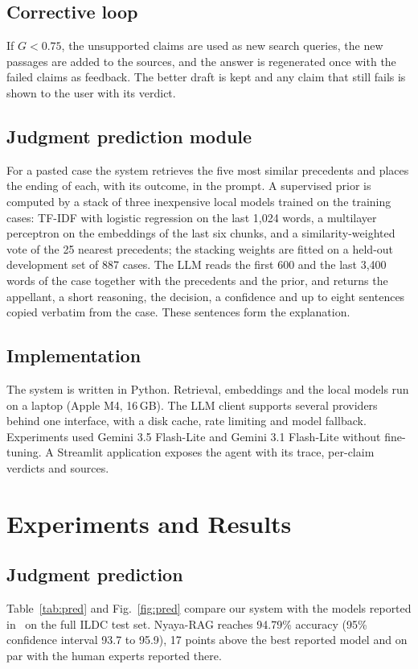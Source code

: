 \documentclass[conference]{IEEEtran}
\begin{document}
\subsection{Corrective loop}
If $G<0.75$, the unsupported claims are used as new search queries, the new passages are added to the sources, and the answer is regenerated once with the failed claims as feedback. The better draft is kept and any claim that still fails is shown to the user with its verdict.

\subsection{Judgment prediction module}
For a pasted case the system retrieves the five most similar precedents and places the ending of each, with its outcome, in the prompt. A supervised prior is computed by a stack of three inexpensive local models trained on the training cases: TF-IDF with logistic regression on the last 1,024 words, a multilayer perceptron on the embeddings of the last six chunks, and a similarity-weighted vote of the 25 nearest precedents; the stacking weights are fitted on a held-out development set of 887 cases. The LLM reads the first 600 and the last 3,400 words of the case together with the precedents and the prior, and returns the appellant, a short reasoning, the decision, a confidence and up to eight sentences copied verbatim from the case. These sentences form the explanation.

\subsection{Implementation}
The system is written in Python. Retrieval, embeddings and the local models run on a laptop (Apple M4, 16\,GB). The LLM client supports several providers behind one interface, with a disk cache, rate limiting and model fallback. Experiments used Gemini 3.5 Flash-Lite and Gemini 3.1 Flash-Lite without fine-tuning. A Streamlit application exposes the agent with its trace, per-claim verdicts and sources.

\section{Experiments and Results}
\subsection{Judgment prediction}
Table~\ref{tab:pred} and Fig.~\ref{fig:pred} compare our system with the models reported in~\cite{malik2021} on the full ILDC test set. Nyaya-RAG reaches 94.79\% accuracy (95\% confidence interval 93.7 to 95.9), 17 points above the best reported model and on par with the human experts reported there.
\end{document}
